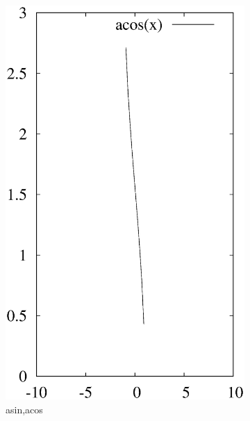 \documentclass[journal=jacsat,manuscript=article]{achemso}
\begin{document}
\begin{figure}[ht]
\begin{subfigure}{0.3\textwidth}
\includegraphics [width=\textwidth]{acos.eps}
\caption{asin,acos}
\end{subfigure}
\begin{subfigure}{0.3\textwidth}

\end{subfigure}
\end{figure}
\end{document}
